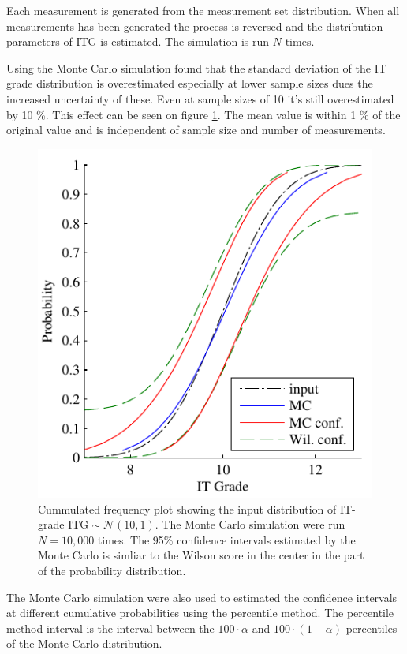 \documentclass[aip,amsmath, reprint, author-year]{revtex4-1}
\begin{document}
Each measurement is generated from the measurement set distribution.
When all measurements has been generated the process is reversed and the distribution parameters of ITG is estimated.
The simulation is run $N$ times.

Using the Monte Carlo simulation found that the standard deviation of the IT grade distribution is overestimated especially at lower sample sizes dues the increased uncertainty of these. 
Even at sample sizes of 10 it's still overestimated by 10 \%. 
This effect can be seen on figure \ref{fig:confidenceIntervals}. The mean value is within 1 \% of the original value and is independent of sample size and number of measurements.  

\begin{figure}
\includegraphics{confidenceIntervals.pdf}
\caption{\label{fig:confidenceIntervals}Cummulated frequency plot showing the input distribution of IT-grade $\mathrm{ITG} \sim \mathcal{N} (10, 1)$. 
The Monte Carlo simulation were run $N = 10,000$ times. 
The 95\% confidence intervals estimated by the Monte Carlo is simliar to the Wilson score in the center in the part of the probability distribution.}
\end{figure}

The Monte Carlo simulation were also used to estimated the confidence intervals at different cumulative probabilities using the percentile method.
The percentile method interval is the interval between the $100 \cdot \alpha$ and $100 \cdot (1-\alpha)$ percentiles of the Monte Carlo distribution. 
\end{document}
